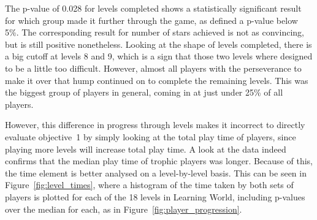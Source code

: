 The p-value of 0.028 for levels completed shows a statistically significant result for which group made it further through the game, as defined a p-value below 5\%. The corresponding result for number of stars achieved is not as convincing, but is still positive nonetheless.
Looking at the shape of levels completed, there is a big cutoff at levels 8 and 9, which is a sign that those two levels where designed to be a little too difficult. However, almost all players with the perseverance to make it over that hump continued on to complete the remaining levels. This was the biggest group of players in general, coming in at just under 25\% of all players.

However, this difference in progress through levels makes it incorrect to directly evaluate objective~1 by simply looking at the total play time of players, since playing more levels will increase total play time. A look at the data indeed confirms that the median play time of trophic players was longer.
Because of this, the time element is better analysed on a level-by-level basis. This can be seen in Figure~\ref{fig:level_times}, where a histogram of the time taken by both sets of players is plotted for each of the 18 levels in Learning World, including p-values over the median for each, as in Figure~\ref{fig:player_progression}.

